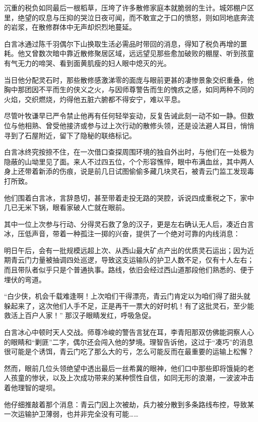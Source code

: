沉重的税负如同最后一根稻草，压垮了许多散修家庭本就脆弱的生计。城郊棚户区里，绝望的叹息与压抑的哭泣日夜可闻，而不敢宣之于口的愤怒，则如同地底奔流的岩浆，在散修群体中无声却炽烈地蔓延。

白言冰通过陈千羽偶尔下山换取生活必需品时带回的消息，得知了税负再增的噩耗。他又曾数次暗中靠近散修聚居区域，远远望见那些愈加破败的棚屋、听到孩童有气无力的啼哭、看到面黄肌瘦的妇人眼中熄灭的光。

当日他分配灵石时，那些散修感激涕零的面庞与眼前更甚的凄惨景象交织重叠，他胸中那团因不平而生的侠义之火，与因师尊警告而生的愧疚之感，如同两种不同的火焰，交织燃烧，灼得他五脏六腑都不得安宁，难以平息。

尽管叶牧谦早已严令禁止他再有任何轻举妄动，反复告诫此刻一动不如一静。但数位与他相熟、曾受他接济或参与过上次行动的散修头领，还是设法避人耳目，悄悄寻到了石屋附近，留下了隐秘的联络标记。

白言冰终究按捺不住，在一次借口查探周围环境的独自外出时，与他们在一处极为隐蔽的山坳里见了面。来人不过四五位，个个形容憔悴，眼中布满血丝，其中两人身上还带着新添的伤痕，说是前几日试图偷偷多藏几块灵石，被青云门监工发现毒打所致。

他们围着白言冰，言辞恳切，甚至带着走投无路的哭腔，诉说四成重税之下，家中几已无米下锅，眼看家破人亡就在眼前。

其中一位上次参与行动、分得灵石救了急的汉子，更是左右确认无人后，凑近白言冰，压低声音，带着一种孤注一掷的兴奋，提供了一个绝对可靠的内线消息：

明日午后，会有一批规模远超上次、从西山最大矿点产出的优质灵石运出；因为近期青云门力量被抽调四处巡逻，导致这支运输队的护卫人数不足，仅有十人左右；而且带队者似乎只是个普通执事。路线，依旧会经过西山道那段他们熟悉的、便于埋伏的弯道。

“白少侠，机会千载难逢啊！上次咱们干得漂亮，青云门肯定以为咱们得了甜头就躲起来了，这次他们人手不足，正是再干一票大的好时机！有了这批灵石，至少能救活上百户人家！” 那汉子眼睛发红，呼吸急促。

白言冰心中顿时天人交战。师尊冷峻的警告言犹在耳，李青阳那双仿佛能洞察人心的眼睛和“剿匪”二字，偶尔还会闯入他的梦境。理智告诉他，这过于“凑巧”的消息很可能是个诱饵，青云门吃了那么大的亏，怎么可能反而在最重要的运输上松懈？

然而，眼前几位头领绝望中透出最后一丝希冀的眼神，他们口中那些即将饿毙的老人孩童的惨状，以及上次成功带来的某种惯性自信，如同无形的浪潮，一波波冲击着他理智的堤坝。

他仔细推敲着那个消息：青云门因上次被劫，兵力被分散到多条路线布控，导致某一次运输护卫薄弱，也并非完全没有可能……

